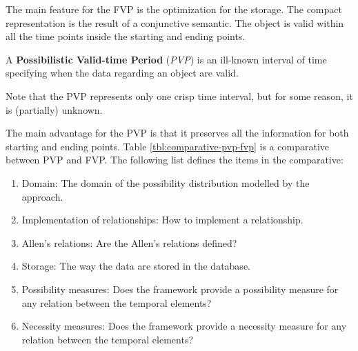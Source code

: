 \vspace*{13pt}


The main feature for the FVP is the optimization for the storage. The compact representation is the result of a conjunctive semantic. The object is valid within all the time points inside the starting and ending points.


\begin{definition}
A \textbf{Possibilistic Valid-time Period} (\emph{PVP}) is an ill-known interval of time specifying when the data regarding an object are valid.
\end{definition}

Note that the PVP represents only one crisp time interval, but for some reason, it is (partially) unknown.

The main advantage for the PVP is that it preserves all the information for both starting and ending points\cite{Pons2011,Pons2012}. Table \ref{tbl:comparative-pvp-fvp} is a comparative between PVP and FVP. The following list defines the items in the comparative:

\begin{enumerate}
\item Domain: The domain of the possibility distribution modelled by the approach.
\item Implementation of relationships: How to implement a relationship.
\item Allen's relations: Are the Allen's relations defined?
\item Storage: The way the data are stored in the database.
\item Possibility measures: Does the framework provide a possibility measure for any relation between the temporal elements?
\item Necessity measures:  Does the framework provide a necessity measure for any relation between the temporal elements?
\end{enumerate}


